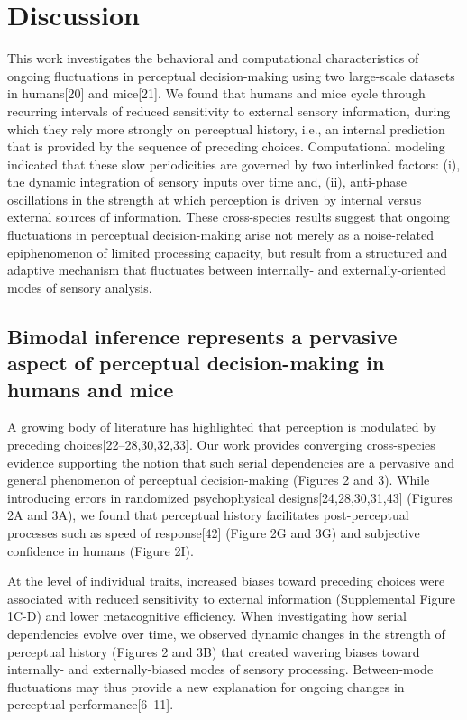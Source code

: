 \documentclass[
]{article}
\begin{document}
\hypertarget{discussion}{%
\section{Discussion}\label{discussion}}

This work investigates the behavioral and computational characteristics
of ongoing fluctuations in perceptual decision-making using two
large-scale datasets in humans{[}20{]} and mice{[}21{]}. We found that
humans and mice cycle through recurring intervals of reduced sensitivity
to external sensory information, during which they rely more strongly on
perceptual history, i.e., an internal prediction that is provided by the
sequence of preceding choices. Computational modeling indicated that
these slow periodicities are governed by two interlinked factors: (i),
the dynamic integration of sensory inputs over time and, (ii),
anti-phase oscillations in the strength at which perception is driven by
internal versus external sources of information. These cross-species
results suggest that ongoing fluctuations in perceptual decision-making
arise not merely as a noise-related epiphenomenon of limited processing
capacity, but result from a structured and adaptive mechanism that
fluctuates between internally- and externally-oriented modes of sensory
analysis.

\hypertarget{bimodal-inference-represents-a-pervasive-aspect-of-perceptual-decision-making-in-humans-and-mice}{%
\subsection{Bimodal inference represents a pervasive aspect of
perceptual decision-making in humans and
mice}\label{bimodal-inference-represents-a-pervasive-aspect-of-perceptual-decision-making-in-humans-and-mice}}

A growing body of literature has highlighted that perception is
modulated by preceding choices{[}22--28,30,32,33{]}. Our work provides
converging cross-species evidence supporting the notion that such serial
dependencies are a pervasive and general phenomenon of perceptual
decision-making (Figures 2 and 3). While introducing errors in
randomized psychophysical designs{[}24,28,30,31,43{]} (Figures 2A and
3A), we found that perceptual history facilitates post-perceptual
processes such as speed of response{[}42{]} (Figure 2G and 3G) and
subjective confidence in humans (Figure 2I).

At the level of individual traits, increased biases toward preceding
choices were associated with reduced sensitivity to external information
(Supplemental Figure 1C-D) and lower metacognitive efficiency. When
investigating how serial dependencies evolve over time, we observed
dynamic changes in the strength of perceptual history (Figures 2 and 3B)
that created wavering biases toward internally- and externally-biased
modes of sensory processing. Between-mode fluctuations may thus provide
a new explanation for ongoing changes in perceptual
performance{[}6--11{]}.
\end{document}
